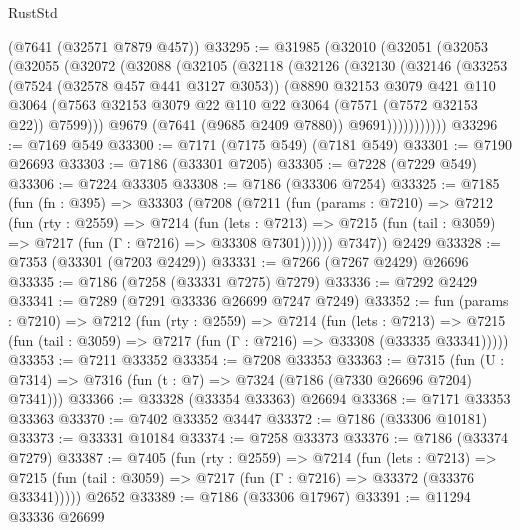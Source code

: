 \begin{lexlean}{RustStd}
\begin{coremodule}
    (@7641 (@32571 @7879 @457))
@33295 := @31985
    (@32010
      (@32051
        (@32053
          (@32055
            (@32072
              (@32088
                (@32105
                  (@32118
                    (@32126
                      (@32130
                        (@32146
                          (@33253
                            (@7524 (@32578 @457 @441 @3127 @3053))
                            (@8890
                              @32153
                              @3079
                              @421
                              @110
                              @3064
                              (@7563
                                @32153
                                @3079
                                @22
                                @110
                                @22
                                @3064
                                (@7571 (@7572 @32153 @22))
                                @7599)))
                          @9679
                          (@7641 (@9685 @2409 @7880))
                          @9691)))))))))))
@33296 := @7169 @549
@33300 := @7171 (@7175 @549) (@7181 @549)
@33301 := @7190 @26693
@33303 := @7186 (@33301 @7205)
@33305 := @7228 (@7229 @549)
@33306 := @7224 @33305
@33308 := @7186 (@33306 @7254)
@33325 := @7185
    (fun (fn : @395) =>
    @33303
      (@7208
        (@7211
          (fun (params : @7210) =>
          @7212
            (fun (rty : @2559) =>
            @7214
              (fun (lets : @7213) =>
              @7215 (fun (tail : @3059) => @7217 (fun (Γ : @7216) => @33308 @7301))))))
        @7347))
    @2429
@33328 := @7353 (@33301 (@7203 @2429))
@33331 := @7266 (@7267 @2429) @26696
@33335 := @7186 (@7258 (@33331 @7275) @7279)
@33336 := @7292 @2429
@33341 := @7289 (@7291 @33336 @26699 @7247 @7249)
@33352 := fun (params : @7210) =>
  @7212
    (fun (rty : @2559) =>
    @7214
      (fun (lets : @7213) =>
      @7215 (fun (tail : @3059) => @7217 (fun (Γ : @7216) => @33308 (@33335 @33341)))))
@33353 := @7211 @33352
@33354 := @7208 @33353
@33363 := @7315
    (fun (U : @7314) => @7316 (fun (t : @7) => @7324 (@7186 (@7330 @26696 @7204) @7341)))
@33366 := @33328 (@33354 @33363) @26694
@33368 := @7171 @33353 @33363
@33370 := @7402 @33352 @3447
@33372 := @7186 (@33306 @10181)
@33373 := @33331 @10184
@33374 := @7258 @33373
@33376 := @7186 (@33374 @7279)
@33387 := @7405
    (fun (rty : @2559) =>
    @7214
      (fun (lets : @7213) =>
      @7215 (fun (tail : @3059) => @7217 (fun (Γ : @7216) => @33372 (@33376 @33341)))))
    @2652
@33389 := @7186 (@33306 @17967)
@33391 := @11294 @33336 @26699

\end{coremodule}
\end{lexlean}
